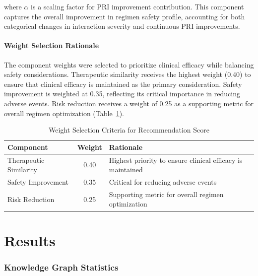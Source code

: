 \documentclass[11pt,a4paper]{article}
\begin{document}
where $\alpha$ is a scaling factor for PRI improvement contribution. This component captures the overall improvement in regimen safety profile, accounting for both categorical changes in interaction severity and continuous PRI improvements.

\subsection{Weight Selection Rationale}

The component weights were selected to prioritize clinical efficacy while balancing safety considerations. Therapeutic similarity receives the highest weight (0.40) to ensure that clinical efficacy is maintained as the primary consideration. Safety improvement is weighted at 0.35, reflecting its critical importance in reducing adverse events. Risk reduction receives a weight of 0.25 as a supporting metric for overall regimen optimization (Table~\ref{tab:weight_rationale}).

\begin{table}[H]
\centering
\caption{Weight Selection Criteria for Recommendation Score}
\label{tab:weight_rationale}
\begin{tabular}{lcp{8cm}}
\toprule
\textbf{Component} & \textbf{Weight} & \textbf{Rationale} \\
\midrule
Therapeutic Similarity & 0.40 & Highest priority to ensure clinical efficacy is maintained \\
Safety Improvement & 0.35 & Critical for reducing adverse events \\
Risk Reduction & 0.25 & Supporting metric for overall regimen optimization \\
\bottomrule
\end{tabular}
\end{table}

\newpage


\part{Results}

\section{Knowledge Graph Statistics}
\end{document}
